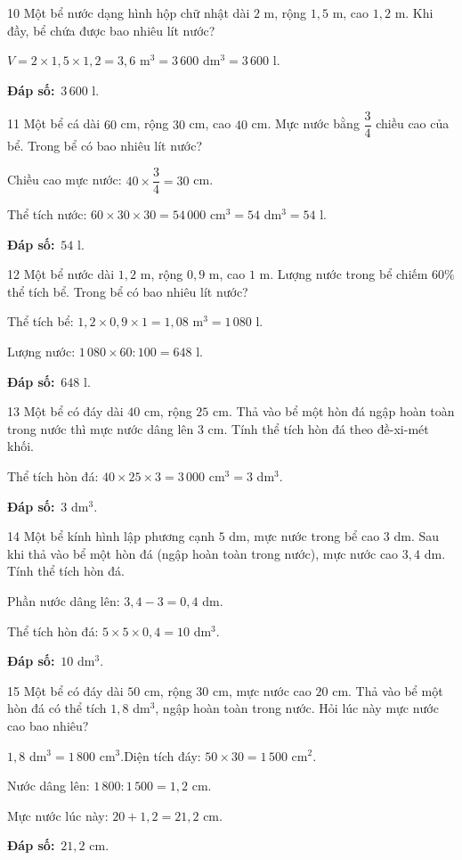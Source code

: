 \documentclass[11pt]{article}
\newif\ifsol \solfalse
\providecommand{\AnsWord}{Đáp số}
\newcommand{\dapso}[1]{\par\textbf{\AnsWord:}\ #1}
\newcommand{\probsol}[1]{%
  \begin{lrbox}{\solmeasure}\begin{minipage}{\dimexpr\linewidth-24pt\relax}#1\end{minipage}\end{lrbox}%
  \ifsol
    \begin{solbox}#1\end{solbox}%
  \else
    \setlength{\solht}{\dimexpr\ht\solmeasure+\dp\solmeasure+0.85cm\relax}%
    \ifdim\solht<1.35cm\setlength{\solht}{1.35cm}\fi
    \begin{tcolorbox}[colback=white,colframe=Line,boxrule=0.8pt,arc=5pt,
      left=8pt,right=8pt,top=4pt,bottom=4pt,height=\solht]{\footnotesize\color{Slate}\itshape\WorkWord}\end{tcolorbox}%
  \fi}
\newcommand{\gap}{\vspace{0.3cm}}
\def\WorkWord{Bài làm:}
\def\AnsWord{Đáp số}
\begin{document}
\gap
\begin{probbox}{10}{\relax}
Một bể nước dạng hình hộp chữ nhật dài $2$ m, rộng $1{,}5$ m, cao $1{,}2$ m. Khi đầy, bể chứa được bao nhiêu lít nước?
\end{probbox}
\probsol{
$V=2\times1{,}5\times1{,}2=3{,}6$ m$^3=3\,600$ dm$^3=3\,600$ l.
\dapso{$3\,600$ l.}}
\gap
\begin{probbox}{11}{\relax}
Một bể cá dài $60$ cm, rộng $30$ cm, cao $40$ cm. Mực nước bằng $\dfrac34$ chiều cao của bể. Trong bể có bao nhiêu lít nước?
\end{probbox}
\probsol{
Chiều cao mực nước: $40\times\dfrac34=30$ cm.\par
Thể tích nước: $60\times30\times30=54\,000$ cm$^3=54$ dm$^3=54$ l.
\dapso{$54$ l.}}
\gap
\begin{probbox}{12}{\relax}
Một bể nước dài $1{,}2$ m, rộng $0{,}9$ m, cao $1$ m. Lượng nước trong bể chiếm $60\%$ thể tích bể. Trong bể có bao nhiêu lít nước?
\end{probbox}
\probsol{
Thể tích bể: $1{,}2\times0{,}9\times1=1{,}08$ m$^3=1\,080$ l.\par
Lượng nước: $1\,080\times60:100=648$ l.
\dapso{$648$ l.}}
\gap
\begin{probbox}{13}{\relax}
Một bể có đáy dài $40$ cm, rộng $25$ cm. Thả vào bể một hòn đá ngập hoàn toàn trong nước thì mực nước dâng lên $3$ cm. Tính thể tích hòn đá theo đề-xi-mét khối.
\end{probbox}
\probsol{
Thể tích hòn đá: $40\times25\times3=3\,000$ cm$^3=3$ dm$^3$.
\dapso{$3$ dm$^3$.}}
\gap
\begin{probbox}{14}{\relax}
Một bể kính hình lập phương cạnh $5$ dm, mực nước trong bể cao $3$ dm. Sau khi thả vào bể một hòn đá (ngập hoàn toàn trong nước), mực nước cao $3{,}4$ dm. Tính thể tích hòn đá.
\end{probbox}
\probsol{
Phần nước dâng lên: $3{,}4-3=0{,}4$ dm.\par
Thể tích hòn đá: $5\times5\times0{,}4=10$ dm$^3$.
\dapso{$10$ dm$^3$.}}
\gap
\begin{probbox}{15}{\relax}
Một bể có đáy dài $50$ cm, rộng $30$ cm, mực nước cao $20$ cm. Thả vào bể một hòn đá có thể tích $1{,}8$ dm$^3$, ngập hoàn toàn trong nước. Hỏi lúc này mực nước cao bao nhiêu?
\end{probbox}
\probsol{
$1{,}8$ dm$^3=1\,800$ cm$^3$.\quad Diện tích đáy: $50\times30=1\,500$ cm$^2$.\par
Nước dâng lên: $1\,800:1\,500=1{,}2$ cm.\par
Mực nước lúc này: $20+1{,}2=21{,}2$ cm.
\dapso{$21{,}2$ cm.}}
\end{document}
